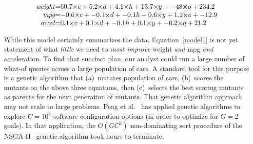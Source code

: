 {\small
\begin{equation}\label{model1}
\begin{array}{r@{=}l} 
  \mathit{weight} &
 60.7{\times}c +
      5.2{\times}d +
      4.1{\times}h +
     13.7{\times}y +
    -48{\times}o +
    234.2 \\     
  \mathit{mpg} &
     -0.6{\times}c +
     -0.1{\times}d +
     -0.1h +
      0.6{\times}y +
      1.2{\times}o +
     -12.9 \\   
 \mathit{accel} &
      0.1{\times}c +
      0.1{\times}d +
     -0.1h +
      0.1{\times}y +
     -0.2{\times}o +
     21.2\end{array} \end{equation}
     }
     

While this model certainly summarizes the data, 
Equation~\ref{model1} is not yet statement of what {\em little}
we need  to {\em most improve} 
weight {\em and} mpg 
{\em and} acceleration.
To find that succinct plan, our analyst could run a large number
of what-of queries across a large population of cars.
A standard tool for this purpose is a   genetic algorithm that 
(a)~mutates population of cars,   (b)~scores the mutants
on the above three equations, then (c)~selects the best scoring mutants as parents for
the next generation of mutants.
That genetic algorithm approach may not scale to large problems.
Peng et al.~\cite{kewen21} has applied genetic algorithms to explore $C=10^4$ software configuration options
(in order to optimize for $G=2$ goals). In that application,
the $O(GC^3)$ non-dominating sort procedure of the NSGA-II~\cite{deb02} genetic algorithm took hours to terminate.  

